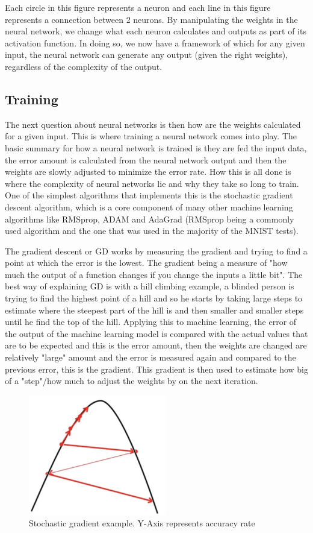 \documentclass[a4paper,oneside,phd,etd]{BYUPhys}
\begin{document}
Each circle in this figure represents a neuron and each line in this figure represents a connection between 2 neurons. By manipulating the weights in the neural network, we change what each neuron calculates and outputs as part of its activation function. In doing so, we now have a framework of which for any given input, the neural network can generate any output (given the right weights), regardless of the complexity of the output\cite{nielsen}. 

\subsection{Training}
The next question about neural networks is then how are the weights calculated for a given input. This is where training a neural network comes into play. The basic summary for how a neural network is trained is they are fed the input data, the error amount is calculated from the neural network output and then the weights are slowly adjusted to minimize the error rate. How this is all done is where the complexity of neural networks lie and why they take so long to train. One of the simplest algorithms that implements this is the stochastic gradient descent algorithm, which is a core component of many other machine learning algorithms like RMSprop, ADAM and AdaGrad (RMSprop being a commonly used algorithm and the one that was used in the majority of the MNIST tests). 

The gradient descent or GD works by measuring the gradient and trying to find a point at which the error is the lowest. The gradient being a measure of "how much the output of a function changes if you change the inputs a little bit"\cite{towards-data-science}.
The best way of explaining GD is with a hill climbing example, a blinded person is trying to find the highest point of a hill and so he starts by taking large steps to estimate where the steepest part of the hill is and then smaller and smaller steps until he find the top of the hill. Applying this to machine learning, the error of the output of the machine learning model is compared with the actual values that are to be expected and this is the error amount, then the weights are changed are relatively "large" amount and the error is measured again and compared to the previous error, this is the gradient. This gradient is then used to estimate how big of a "step"/how much to adjust the weights by on the next iteration.
\begin{figure}[H]
\centering
\includegraphics[width=6cm]{pictures/gradient.png}
\caption{Stochastic gradient example.
Y-Axis represents accuracy rate}
\label{fig:gradient}
\end{figure}
\end{document}
